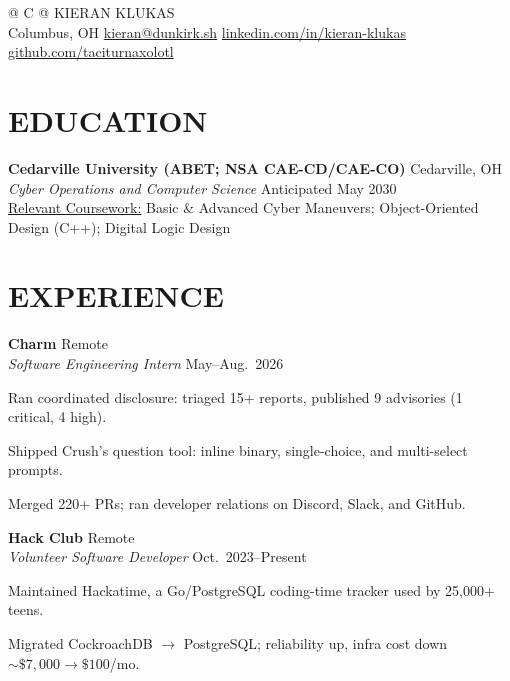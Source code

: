 \documentclass[a4paper,10pt]{article}
\makeatletter
\newlength{\mpwidth}
\newenvironment{orgblock}[2]{%
  \par\noindent\textbf{#1} \hfill #2\\%
}{\par\vspace{3pt}}
\newenvironment{subxp}[2]{%
  \noindent\textit{#1} \hfill #2\\%
  \begin{minipage}[t]{\mpwidth}%
    \begingroup
      \setlength{\leftskip}{0pt}\setlength{\parindent}{0pt}\setlength{\parskip}{0pt}
      \makeatletter
      \def\my@itemize{%
        \list{\labelitemi}{%
          \setlength{\leftmargin}{0.8em}%
          \setlength{\itemindent}{0pt}%
          \setlength{\labelsep}{0.6em}%
          \setlength{\labelwidth}{0pt}%
          \setlength{\parsep}{0pt}%
          \setlength{\topsep}{0pt}%
          \setlength{\partopsep}{0pt}%
          \setlength{\itemsep}{2pt}%
        }%
      }%
      \makeatother
      \renewcommand{\labelitemi}{\textendash}%
      \my@itemize
}{%
      \endlist
    \endgroup
  \end{minipage}%
  \par\vspace{2pt}%
}
\makeatother
\begin{document}
\pagestyle{empty}

\begin{tabularx}{\linewidth}{@{} C @{}}
\Huge{KIERAN KLUKAS} \\[6pt]
\center
Columbus, OH \textbar{} \href{mailto:kieran@dunkirk.sh}{kieran@dunkirk.sh} \textbar{} \href{https://linkedin.com/in/kieran-klukas}{linkedin.com/in/kieran-klukas} \textbar{} \href{https://github.com/taciturnaxolotl}{github.com/taciturnaxolotl}
\end{tabularx}

\section{EDUCATION}
\textbf{Cedarville University (ABET; NSA CAE-CD/CAE-CO)} \hfill Cedarville, OH\\
\textit{Cyber Operations and Computer Science} \hfill Anticipated May 2030\\
\underline{Relevant Coursework:} Basic \& Advanced Cyber Maneuvers; Object-Oriented Design (C++); Digital Logic Design

\section{EXPERIENCE}
\begin{orgblock}{Charm}{Remote}
  \begin{subxp}{Software Engineering Intern}{May--Aug.\ 2026}
    \item Ran coordinated disclosure: triaged 15+ reports, published 9 advisories (1 critical, 4 high).
    \item Shipped Crush's question tool: inline binary, single-choice, and multi-select prompts.
    \item Merged 220+ PRs; ran developer relations on Discord, Slack, and GitHub.
  \end{subxp}
\end{orgblock}

\begin{orgblock}{Hack Club}{Remote}
  \begin{subxp}{Volunteer Software Developer}{Oct.\ 2023--Present}
    \item Maintained Hackatime, a Go/PostgreSQL coding-time tracker used by 25{,}000+ teens.
    \item Migrated CockroachDB $\rightarrow$ PostgreSQL; reliability up, infra cost down $\sim\$7{,}000 \rightarrow \$100$/mo.
  \end{subxp}
\end{orgblock}
\end{document}
